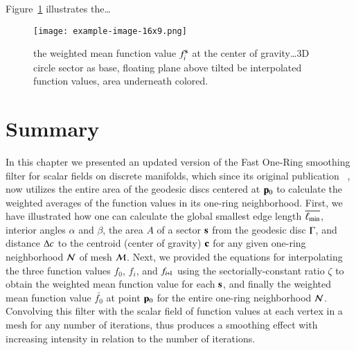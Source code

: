 Figure~\ref{fig:weightedMean} illustrates the\dots
\begin{figure}[ht]
\ffigbox
	{\texttt{[image: example-image-16x9.png]}}
	{\caption[Weighted Mean function value $f^\bs_i$ at the center of gravity]{the weighted mean function value $f^\bs_i$ at the center of gravity\ldots 3D circle sector as base, floating plane above tilted be interpolated function values, area underneath colored.}\label{fig:weightedMean}}
\end{figure}
%
\section{Summary}
\label{ch4sS}
In this chapter we presented an updated version of the Fast One-Ring smoothing filter for scalar fields on discrete manifolds, which since its original publication ~\cite[s.~3.2]{Mara17}, now utilizes the entire area of the geodesic discs centered at $\mathbf{p}_0$ to calculate the weighted averages of the function values in its one-ring neighborhood. First, we have illustrated how one can calculate the global smallest edge length $\overline{\ell_\text{min}}$, interior angles $\alpha$ and $\beta$, the area $A$ of a sector $\mathbf{s}$ from the geodesic disc $\Gamma$, and distance $\Delta c$ to the centroid (center of gravity) $\mathbf{c}$ for any given one-ring neighborhood $\mathcal{N}$ of mesh $\mathcal{M}$. Next, we provided the equations for interpolating the three function values $f_0$, $f_i$, and $f_{\sipo}$ using the sectorially-constant ratio $\zeta$ to obtain the weighted mean function value for each $\mathbf{s}$, and finally the weighted mean function value $\bar{f_0}$ at point ${\mathbf{p}_0}$ for the entire one-ring neighborhood $\mathcal{N}$. Convolving this filter with the scalar field of function values at each vertex in a mesh for any number of iterations, thus produces a smoothing effect with increasing intensity in relation to the number of iterations.

